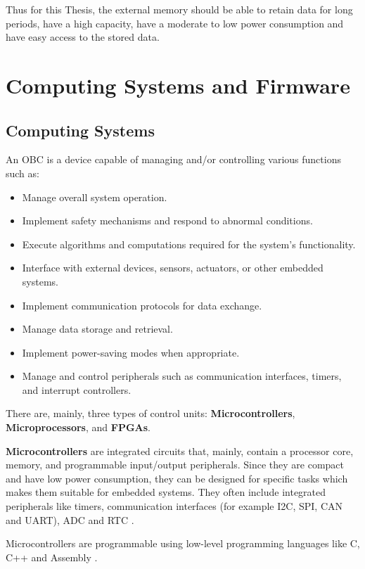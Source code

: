 Thus for this Thesis, the external memory should be able to retain data for long periods, have a high capacity, have a moderate to low power consumption and have easy access to the stored data.


\section{Computing Systems and Firmware}

\subsection{Computing Systems}
An \gls{OBC} is a device capable of managing and/or controlling various functions such as:
\begin{itemize}
    \item Manage overall system operation.
    \item Implement safety mechanisms and respond to abnormal conditions.
    \item Execute algorithms and computations required for the system's functionality.
    \item Interface with external devices, sensors, actuators, or other embedded systems.
    \item Implement communication protocols for data exchange.
    \item Manage data storage and retrieval.
    \item Implement power-saving modes when appropriate.
    \item Manage and control peripherals such as communication interfaces, timers, and interrupt controllers.
\end{itemize}

There are, mainly, three types of control units: \textbf{Microcontrollers}, \textbf{Microprocessors}, and \textbf{\glspl{FPGA}}.

\textbf{Microcontrollers} are integrated circuits that, mainly, contain a processor core, memory, and programmable input/output peripherals.
Since they are compact and have low power consumption, they can be designed for specific tasks which makes them suitable for embedded systems.
They often include integrated peripherals like timers, communication interfaces (for example \gls{I2C}, \gls{SPI}, \gls{CAN} and \gls{UART}), \gls{ADC} and \gls{RTC} \cite{OBC1}.

Microcontrollers are programmable using low-level programming languages like C, C++ and Assembly \cite{OBC1}.

